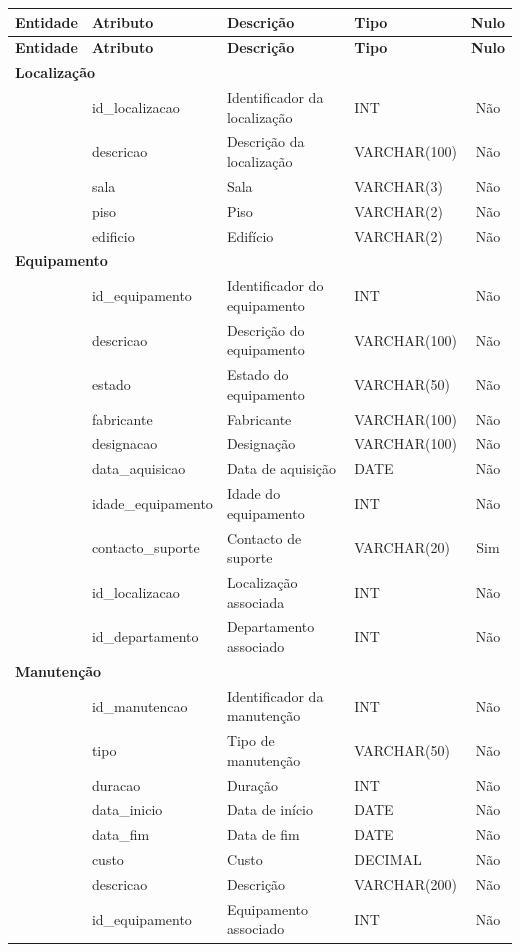 {\tiny
\begin{longtable}{p{2.5cm} p{3cm} p{5cm} p{2cm} c}
\toprule
\textbf{Entidade} & \textbf{Atributo} & \textbf{Descrição} & \textbf{Tipo} & \textbf{Nulo} \\
\midrule
\endfirsthead

\toprule
\textbf{Entidade} & \textbf{Atributo} & \textbf{Descrição} & \textbf{Tipo} & \textbf{Nulo} \\
\midrule
\endhead

\multicolumn{5}{l}{\textbf{Localização}} \\
\midrule
 & id_localizacao & Identificador da localização & INT & Não \\
 & descricao & Descrição da localização & VARCHAR(100) & Não \\
 & sala & Sala & VARCHAR(3) & Não \\
 & piso & Piso & VARCHAR(2) & Não \\
 & edificio & Edifício & VARCHAR(2) & Não \\

\midrule
\multicolumn{5}{l}{\textbf{Equipamento}} \\
\midrule
 & id_equipamento & Identificador do equipamento & INT & Não \\
 & descricao & Descrição do equipamento & VARCHAR(100) & Não \\
 & estado & Estado do equipamento & VARCHAR(50) & Não \\
 & fabricante & Fabricante & VARCHAR(100) & Não \\
 & designacao & Designação & VARCHAR(100) & Não \\
 & data_aquisicao & Data de aquisição & DATE & Não \\
 & idade_equipamento & Idade do equipamento & INT & Não \\
 & contacto_suporte & Contacto de suporte & VARCHAR(20) & Sim \\
 & id_localizacao & Localização associada & INT & Não \\
 & id_departamento & Departamento associado & INT & Não \\

\midrule
\multicolumn{5}{l}{\textbf{Manutenção}} \\
\midrule
 & id_manutencao & Identificador da manutenção & INT & Não \\
 & tipo & Tipo de manutenção & VARCHAR(50) & Não \\
 & duracao & Duração & INT & Não \\
 & data_inicio & Data de início & DATE & Não \\
 & data_fim & Data de fim & DATE & Não \\
 & custo & Custo & DECIMAL & Não \\
 & descricao & Descrição & VARCHAR(200) & Não \\
 & id_equipamento & Equipamento associado & INT & Não \\


\end{longtable}}
